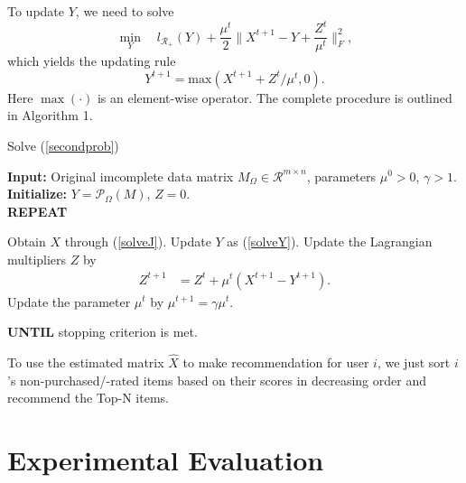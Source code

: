 \documentclass[letterpaper]{article}
\begin{document}
To update $Y$, we need to solve
\begin{equation}
\min_Y \quad l_{\mathcal{R}_+}(Y)+\frac{\mu^t}{2}\|X^{t+1}-Y+\frac{Z^t}{\mu^t}\|_F^2,
\end{equation}
which yields the updating rule
\begin{equation}
\label{solveY}
Y^{t+1}= \textrm{max}(X^{t+1}+Z^t/\mu^t,0).
\end{equation}
Here $\max(\cdot)$ is an element-wise operator. The complete procedure is outlined in Algorithm 1.
\begin{algorithm}[tb]
\small
   \caption{Solve (\ref{secondprob})}
   \label{alg:rankminimization}
  {\bfseries Input:} Original imcomplete data matrix $M_\Omega\in \mathbf{\mathcal{R}}^{m\times n}$, parameters  $\mu^0>0$, $\gamma>1$.\\
{\bfseries Initialize:} $Y=\mathcal{P}_\Omega(M)$, $Z=0$.\\
  {\bfseries REPEAT}
\begin{algorithmic}[1]
   \STATE Obtain $X$ through (\ref{solveJ}).
   \STATE Update $Y$ as (\ref{solveY}).
\STATE Update the Lagrangian multipliers $Z$ by
\begin{align*}
Z^{t+1}&=Z^{t}+\mu^t(X^{t+1}-Y^{t+1}).
\end{align*}
\STATE Update the parameter $\mu^t$ by $\mu^{t+1}=\gamma\mu^t$.
\end{algorithmic}
\textbf{ UNTIL} {stopping criterion is met.}
\end{algorithm}

To use the estimated matrix $\hat{X}$ to make recommendation for user $i$, we just sort $i$'s non-purchased/-rated items based on their scores in decreasing order and recommend the Top-N items.

\section{Experimental Evaluation}
\end{document}

